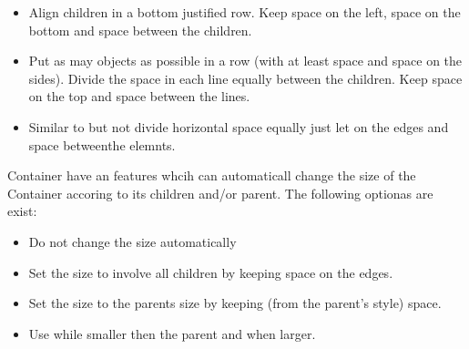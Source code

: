 \documentclass[letterpaper,10pt,english]{sphinxmanual}
\begin{document}
\begin{itemize}
\item {} 
 Align children in a bottom justified row. Keep  space on the left,  space on the bottom and  space between the children.

\item {} 
 Put as may objects as possible in a row (with at least  space and  space on the sides). Divide the space in each line equally between the children.
Keep  space on the top and  space between the lines.

\item {} 
 Similar to  but not divide horizontal space equally just let  on the edges and  space betweenthe elemnts.

\end{itemize}

Container have an  features whcih can automaticall change the size of the Container accoring to its children and/or parent. The following optionas are exist:
\begin{itemize}
\item {} 
 Do not change the size automatically

\item {} 
 Set the size to involve all children by keeping  space on the edges.

\item {} 
 Set the size to the parents size by keeping  (from the parent’s style) space.

\item {} 
 Use  while smaller then the parent and  when larger.

\end{itemize}
\end{document}
